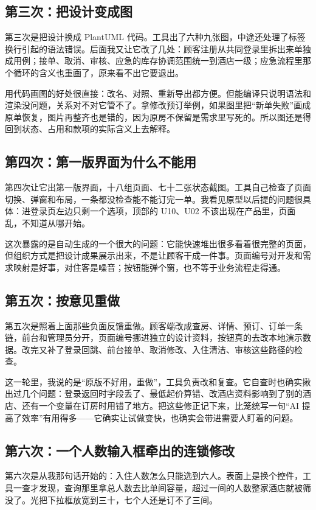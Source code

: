 \documentclass[UTF8,a4paper,zihao=-4,fontset=none]{ctexart}
\begin{document}
\subsection{第三次：把设计变成图}
第三次是把设计换成 PlantUML 代码。工具出了六种九张图，中途还处理了标签换行引起的语法错误。后面我又让它改了几处：顾客注册从共同登录里拆出来单独成用例；接单、取消、审核、应急的库存协调范围统一到酒店一级；应急流程里那个循环的含义也重画了，原来看不出它要退出。

用代码画图的好处很直接：改名、对照、重新导出都方便。但能编译只说明语法和渲染没问题，关系对不对它管不了。拿修改预订举例，如果图里把“新单失败”画成原单恢复，图片再整齐也是错的，因为原房不保留是需求里写死的。所以图还是得回到状态、占用和款项的实际含义上去解释。

\subsection{第四次：第一版界面为什么不能用}
第四次让它出第一版界面，十八组页面、七十二张状态截图。工具自己检查了页面切换、弹窗和布局，一条都没检查能不能订完一单。我看见原型以后提的问题很具体：进登录页左边只剩一个选项，顶部的 U10、U02 不该出现在产品里，页面乱，不知道从哪开始。

这次暴露的是自动生成的一个很大的问题：它能快速堆出很多看着很完整的页面，但组织方式是把设计成果展示出来，不是让顾客干成一件事。页面编号对开发和需求映射是好事，对住客是噪音；按钮能弹个窗，也不等于业务流程走得通。

\subsection{第五次：按意见重做}
第五次是照着上面那些负面反馈重做。顾客端改成查房、详情、预订、订单一条链，前台和管理员分开，页面编号挪进独立的设计资料，按钮真的去改本地演示数据。改完又补了登录回跳、前台接单、取消修改、入住清洁、审核这些路径的检查。

这一轮里，我说的是“原版不好用，重做”，工具负责改和复查。它自查时也确实揪出过几个问题：登录返回时字段丢了、最低起价算错、改酒店资料影响到了别的酒店、还有一个变量在订房时用错了地方。把这些修正记下来，比笼统写一句“AI 提高了效率”有用得多——它确实让试做变快，也确实会带进需要人盯着的问题。

\subsection{第六次：一个人数输入框牵出的连锁修改}
第六次是从我那句话开始的：入住人数怎么只能选到六人。表面上是换个控件，工具一查才发现，查询那里拿总人数去比单间容量，超过一间的人数整家酒店就被筛没了。光把下拉框放宽到三十，七个人还是订不了三间。
\end{document}
